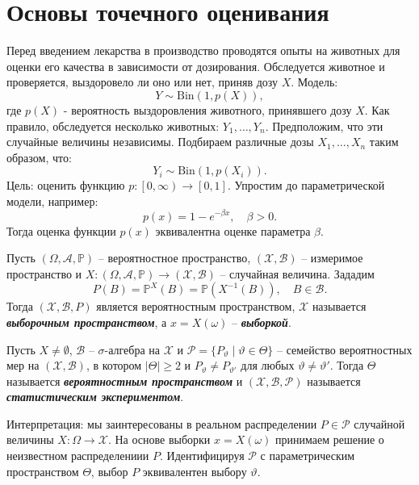 \graphicspath{{./chapters/chapter02/}}
\chapter{Основы точечного оценивания}

\begin{exmp}
	Перед введением лекарства в производство проводятся опыты на животных для оценки его качества в зависимости от дозирования. Обследуется животное и проверяется, выздоровело ли оно или нет, приняв дозу $X$. Модель:
	\[Y \sim \mathrm{Bin}(1, p(X)),\]
	где $p(X)$ - вероятность выздоровления животного, принявшего дозу $X$.
	Как правило, обследуется несколько животных: $Y_1, \dots, Y_n$. Предположим, что эти случайные величины независимы. Подбираем различные дозы $X_1, \dots, X_n$ таким образом, что:
	\[Y_i \sim \mathrm{Bin}(1,p(X_i)). \]
	Цель: оценить функцию $p: \left[0, \infty \right) \rightarrow [0, 1]$. Упростим до параметрической модели, например: \[p(x)=1-e^{-\beta x}, \quad \beta>0 .\]
	Тогда оценка функции $p(x)$ эквивалентна оценке параметра $\beta$.
\end{exmp}

\begin{asmp}
	Пусть $(\Omega, \mathcal{A}, \mathbb{P})$ -- вероятностное пространство, $(\mathcal{X}, \mathcal{B})$ -- измеримое пространство и $X\colon(\Omega, \mathcal{A}, \mathbb{P}) \rightarrow (\mathcal{X}, \mathcal{B})$ -- случайная величина. Зададим
	\[P(B)=\mathbb{P}^X(B)=\mathbb{P}(X^{-1}(B)), \quad B \in \mathcal{B}.  \]
	Тогда $(\mathcal{X}, \mathcal{B}, P)$ является вероятностным пространством, $\mathcal{X}$ называется \textbf{\textit{выборочным пространством}}, а $x=X(\omega)$ -- \textbf{\textit{выборкой}}. 
\end{asmp}

\begin{defn}
	Пусть $X \neq \emptyset$, $\mathcal{B}$ -- $\sigma$-алгебра на $\mathcal{X}$ и $\mathcal{P}=\{P_\vartheta \mid \vartheta \in \Theta \}$ -- семейство вероятностных мер на $(\mathcal{X}, \mathcal{B})$, в котором $|\Theta| \geq 2$ и $P_\vartheta \neq P_{\vartheta'}$ для любых $\vartheta \neq \vartheta'$. Тогда $\Theta$ называется \textbf{\textit{вероятностным пространством}} и $(\mathcal{X}, \mathcal{B}, \mathcal{P})$ называется \textbf{\textit{статистическим экспериментом}}.
\end{defn}

\begin{rmrk}
	Интерпретация: мы заинтересованы в реальном распределении $P \in \mathcal{P}$ случайной величины $X\colon\Omega \rightarrow \mathcal{X}.$ На основе выборки $x=X(\omega)$ принимаем решение о неизвестном распределениии $P$. Идентифицируя $\mathcal{P}$ с параметрическим пространством $\Theta$, выбор $P$ эквивалентен выбору $\vartheta$.
	
\end{rmrk}

